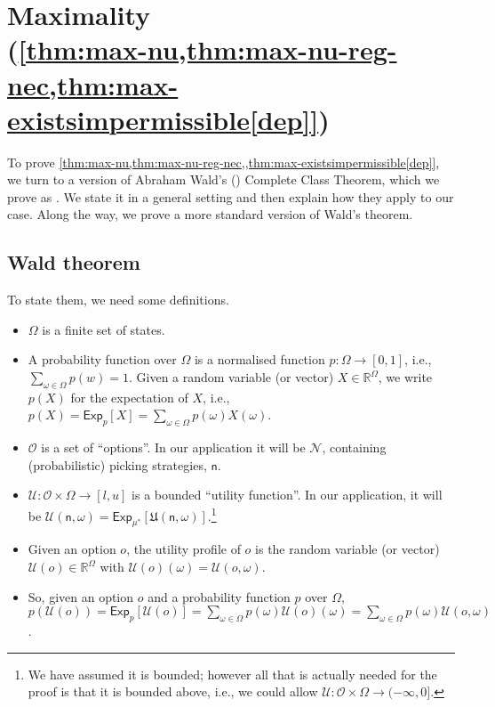 \documentclass[a4paper]{article}
\newcommand\Exp{\mathsf{Exp}}
\renewcommand\O{\mathcal{O}}
\newcommand\U{\mathfrak{U}} %
\newcommand\Uwald{\mathcal{U}} %
\newcommand{\n}{\mathsf{n}}
\newcommand\Nu{\mathcal{N}}
\renewcommand{\Re}{\mathbb{R}}
\newenvironment{CCM rewritten}
{\begingroup\color{blue}} %
{\endgroup}              %
\begin{document}
\section{Maximality \\(\cref{thm:max-nu,thm:max-nu-reg-nec,thm:max-existsimpermissible[dep]})}\label{sect:wald:appendix}
To prove \cref{thm:max-nu,thm:max-nu-reg-nec,,thm:max-existsimpermissible[dep]}, we turn to a version of Abraham Wald's (\citeyear{wald1947cct}) Complete Class Theorem, which we prove as . %
We state it in a general setting and then explain how they apply to our case. Along the way, we prove a more standard version of Wald's theorem.
\subsection{Wald theorem}
 To state them, we need some definitions.

\begin{itemize}
	\item $\Omega$ is a finite set of states.
	\item A probability function over $\Omega$ is a normalised function $p : \Omega \to [0, 1]$, i.e., $\sum_{\omega \in \Omega} p(w) = 1$. Given a random variable (or vector) $X\in\Re^\Omega$, we write $p(X)$ for the expectation of $X$, i.e., $p(X)=\Exp_p[X] = \sum_{\omega\in\Omega}p(\omega)X(\omega)$.%
	\item $\O$ is a set of ``options''. In our application it will be $\Nu$, containing (probabilistic) picking strategies, $\n$.
	\item $\Uwald:\O\times\Omega\to [l,u]$ is a bounded ``utility function''. In our application, it will be $\Uwald(\n,\omega)=\Exp_{\mu^*}[\U(\n,\omega)]$.\footnote{We have assumed it is bounded; however all that is actually needed for the proof is that it is bounded above, i.e., we could allow $\Uwald:\O\times\Omega\to (-\infty,0]$.}
		\item Given an option $o$, the utility profile of $o$ is the random variable (or vector) $\Uwald(o) \in\Re^\Omega$ with $\Uwald(o)(\omega)=\Uwald(o,\omega)$.%
		\item So, given an option $o$ and a probability function $p$ over $\Omega$, $p(\Uwald(o)) = \Exp_p[\Uwald(o)] = \sum_{\omega \in \Omega} p(\omega) \Uwald(o)(\omega) = \sum_{\omega \in \Omega} p(\omega) \Uwald(o, \omega)$.
	\end{itemize}
\end{document}
